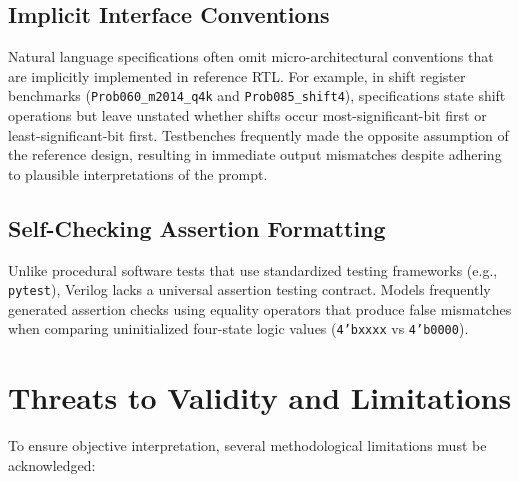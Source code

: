 \documentclass[conference]{IEEEtran}
\begin{document}
\subsection{Implicit Interface Conventions}
Natural language specifications often omit micro-architectural conventions that are implicitly implemented in reference RTL. For example, in shift register benchmarks (\texttt{Prob060\_m2014\_q4k} and \texttt{Prob085\_shift4}), specifications state shift operations but leave unstated whether shifts occur most-significant-bit first or least-significant-bit first. Testbenches frequently made the opposite assumption of the reference design, resulting in immediate output mismatches despite adhering to plausible interpretations of the prompt.

\subsection{Self-Checking Assertion Formatting}
Unlike procedural software tests that use standardized testing frameworks (e.g., \texttt{pytest}), Verilog lacks a universal assertion testing contract. Models frequently generated assertion checks using equality operators that produce false mismatches when comparing uninitialized four-state logic values (\texttt{4'bxxxx} vs \texttt{4'b0000}).

\section{Threats to Validity and Limitations}
To ensure objective interpretation, several methodological limitations must be acknowledged:
\end{document}
